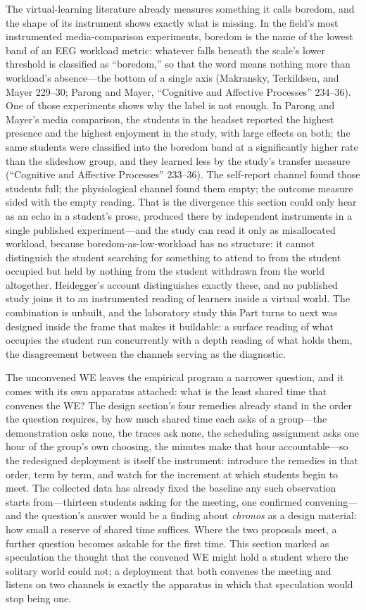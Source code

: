 The virtual-learning literature already measures something it calls
boredom, and the shape of its instrument shows exactly what is
missing. In the field's most instrumented media-comparison
experiments, boredom is the name of the lowest band of an EEG workload
metric: whatever falls beneath the scale's lower threshold is
classified as ``boredom,'' so that the word means nothing more than
workload's absence---the bottom of a single axis (Makransky,
Terkildsen, and Mayer 229--30; Parong and Mayer, ``Cognitive and
Affective Processes'' 234--36). One of those experiments shows why the
label is not enough. In Parong and Mayer's media comparison, the
students in the headset reported the highest presence and the highest
enjoyment in the study, with large effects on both; the same students
were classified into the boredom band at a significantly higher rate
than the slideshow group, and they learned less by the study's
transfer measure (``Cognitive and Affective Processes'' 233--36). The
self-report channel found those students full; the physiological
channel found them empty; the outcome measure sided with the empty
reading. That is the divergence this section could only hear as an
echo in a student's prose, produced there by independent instruments
in a single published experiment---and the study can read it only as
misallocated workload, because boredom-as-low-workload has no
structure: it cannot distinguish the student searching for something
to attend to from the student occupied but held by nothing from the
student withdrawn from the world altogether. Heidegger's account
distinguishes exactly these, and no published study joins it to an
instrumented reading of learners inside a virtual world. The
combination is unbuilt, and the laboratory study this Part turns to
next was designed inside the frame that makes it buildable: a surface
reading of what occupies the student run concurrently with a depth
reading of what holds them, the disagreement between the channels
serving as the diagnostic.

The unconvened WE leaves the empirical program a narrower question,
and it comes with its own apparatus attached: what is the least shared
time that convenes the WE? The design section's four remedies already
stand in the order the question requires, by how much shared time each
asks of a group---the demonstration asks none, the traces ask none,
the scheduling assignment asks one hour of the group's own choosing,
the minutes make that hour accountable---so the redesigned deployment
is itself the instrument: introduce the remedies in that order, term
by term, and watch for the increment at which students begin to meet.
The collected data has already fixed the baseline any such observation
starts from---thirteen students asking for the meeting, one confirmed
convening---and the question's answer would be a finding about
\textit{chronos} as a design material: how small a reserve of shared
time suffices. Where the two proposals meet, a further question
becomes askable for the first time. This section marked as speculation
the thought that the convened WE might hold a student where the
solitary world could not; a deployment that both convenes the meeting
and listens on two channels is exactly the apparatus in which that
speculation would stop being one.


